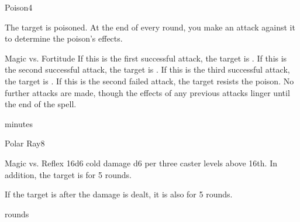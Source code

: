 \begin{spellsection}{Poison}{4}
\begin{spellheader}
\end{spellheader}
\begin{spellcontent}
    \begin{spelltargetinginfo}
    \end{spelltargetinginfo}
    \begin{spelleffects}
        \spelleffect The target is poisoned. At the end of every round, you make an attack against it to determine the poison's effects.
        \begin{spellattack}{Magic vs. Fortitude}
            \spellsuccess If this is the first successful attack, the target is \sickened. If this is the second successful attack, the target is \staggered. If this is the third successful attack, the target is \paralyzed.
            \spellfailure If this is the second failed attack, the target resists the poison. No further attacks are made, though the effects of any previous attacks linger until the end of the spell.
        \end{spellattack}
         minutes \undispellable
    \end{spelleffects}
\end{spellcontent}
\begin{spellfooter}
\end{spellfooter}
\end{spellsection}

\begin{spellsection}{Polar Ray}{8}
\begin{spellheader}
\end{spellheader}
\begin{spellcontent}
    \begin{spelltargetinginfo}
    \end{spelltargetinginfo}
    \begin{spelleffects}
        \begin{spellattack}{Magic vs. Reflex}
            \spellsuccess 16d6 cold damage \add d6 per three caster levels above 16th. In addition, the target is \slowed for 5 rounds.

            If the target is \bloodied after the damage is dealt, it is also \paralyzed for 5 rounds.
        \end{spellattack}
         rounds
    \end{spelleffects}
\end{spellcontent}
\begin{spellfooter}
\end{spellfooter}
\end{spellsection}

